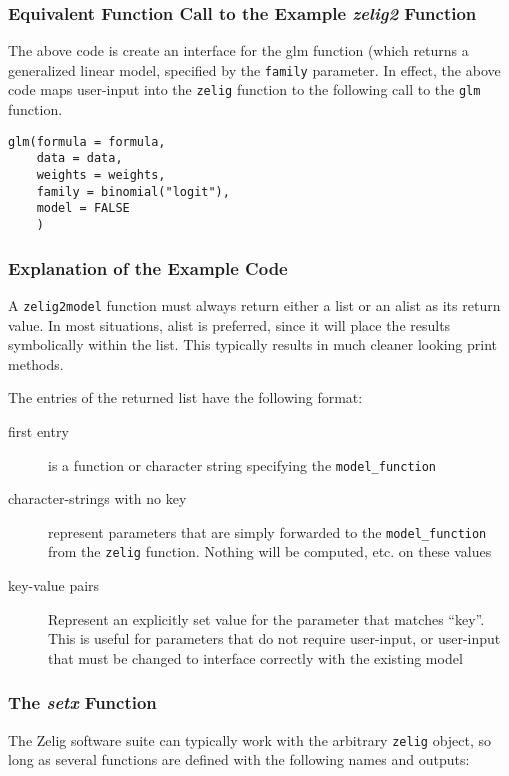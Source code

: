 
\subsubsection{Equivalent Function Call to the Example \emph{zelig2} Function}
The above code is create an interface for the glm function (which returns a generalized linear model, specified by the {\tt family} parameter.  In effect, the above code maps user-input into the {\tt zelig} function to the following call to the {\tt glm} function.

\begin{verbatim}
glm(formula = formula,
    data = data,
    weights = weights,
    family = binomial("logit"),
    model = FALSE
    )
\end{verbatim}

\subsubsection{Explanation of the Example Code}


A {\tt zelig2model} function must always return either a list or an alist as its return value.  In most situations, alist is preferred, since it will place the results symbolically within the list.  This typically results in much cleaner looking print methods.

The entries of the returned list have the following format:
\begin{description}
	\item[first entry]{is a function or character string specifying the {\tt model\_function}}
	\item[character-strings with no key]{represent parameters that are simply forwarded to the {\tt model\_function} from the {\tt zelig} function.  Nothing will be computed, etc. on these values}
	\item[key-value pairs]{Represent an explicitly set value for the parameter that matches ``key''.  This is useful for parameters that do not require user-input, or user-input that must be changed to interface correctly with the existing model}
\end{description}


%
\subsubsection{The \emph{setx} Function}
The Zelig software suite can typically work with the arbitrary {\tt zelig} object, so long as several functions are defined with the following names and outputs:

